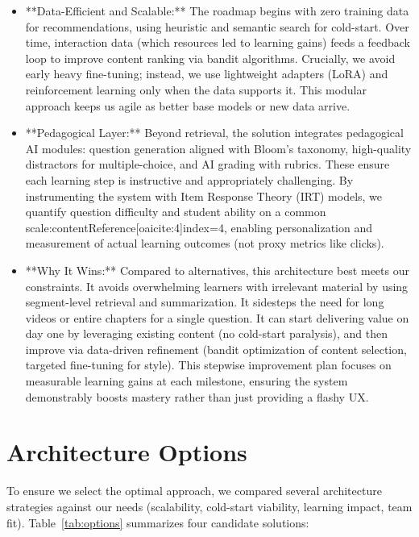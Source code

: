 \documentclass[11pt]{article}
\begin{document}
\begin{itemize}
    \item **Data-Efficient and Scalable:** The roadmap begins with zero training data for recommendations, using heuristic and semantic search for cold-start. Over time, interaction data (which resources led to learning gains) feeds a feedback loop to improve content ranking via bandit algorithms. Crucially, we avoid early heavy fine-tuning; instead, we use lightweight adapters (LoRA) and reinforcement learning only when the data supports it. This modular approach keeps us agile as better base models or new data arrive.
    \item **Pedagogical Layer:** Beyond retrieval, the solution integrates pedagogical AI modules: question generation aligned with Bloom’s taxonomy, high-quality distractors for multiple-choice, and AI grading with rubrics. These ensure each learning step is instructive and appropriately challenging. By instrumenting the system with Item Response Theory (IRT) models, we quantify question difficulty and student ability on a common scale:contentReference[oaicite:4]{index=4}, enabling personalization and measurement of actual learning outcomes (not proxy metrics like clicks).
    \item **Why It Wins:** Compared to alternatives, this architecture best meets our constraints. It avoids overwhelming learners with irrelevant material by using segment-level retrieval and summarization. It sidesteps the need for long videos or entire chapters for a single question. It can start delivering value on day one by leveraging existing content (no cold-start paralysis), and then improve via data-driven refinement (bandit optimization of content selection, targeted fine-tuning for style). This stepwise improvement plan focuses on measurable learning gains at each milestone, ensuring the system demonstrably boosts mastery rather than just providing a flashy UX.
\end{itemize}

\section{Architecture Options}
To ensure we select the optimal approach, we compared several architecture strategies against our needs (scalability, cold-start viability, learning impact, team fit). Table~\ref{tab:options} summarizes four candidate solutions:
\end{document}
